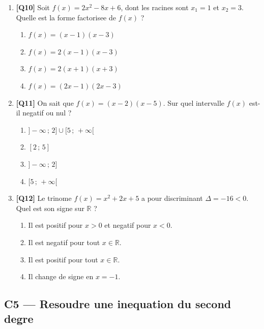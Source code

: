 \begin{enumerate}[resume]

\item \textbf{[Q10]} Soit $f(x) = 2x^2 - 8x + 6$, dont les racines sont $x_1 = 1$ et $x_2 = 3$.
  Quelle est la forme factorisee de $f(x)$ ?

  \begin{enumerate}[label=\Alph*.]
    \item $f(x) = (x - 1)(x - 3)$
    \item $f(x) = 2(x - 1)(x - 3)$
    \item $f(x) = 2(x + 1)(x + 3)$
    \item $f(x) = (2x - 1)(2x - 3)$
  \end{enumerate}

\bigskip

\item \textbf{[Q11]} On sait que $f(x) = (x - 2)(x - 5)$.
  Sur quel intervalle $f(x)$ est-il negatif ou nul ?

  \begin{enumerate}[label=\Alph*.]
    \item $]-\infty\,;\,2] \cup [5\,;\,+\infty[$
    \item $[2\,;\,5]$
    \item $]-\infty\,;\,2]$
    \item $[5\,;\,+\infty[$
  \end{enumerate}

\bigskip

\item \textbf{[Q12]} Le trinome $f(x) = x^2 + 2x + 5$ a pour discriminant $\Delta = -16 < 0$.
  Quel est son signe sur $\mathbb{R}$ ?

  \begin{enumerate}[label=\Alph*.]
    \item Il est positif pour $x > 0$ et negatif pour $x < 0$.
    \item Il est negatif pour tout $x \in \mathbb{R}$.
    \item Il est positif pour tout $x \in \mathbb{R}$.
    \item Il change de signe en $x = -1$.
  \end{enumerate}

\end{enumerate}

\bigskip

\subsection*{C5 — Resoudre une inequation du second degre}


